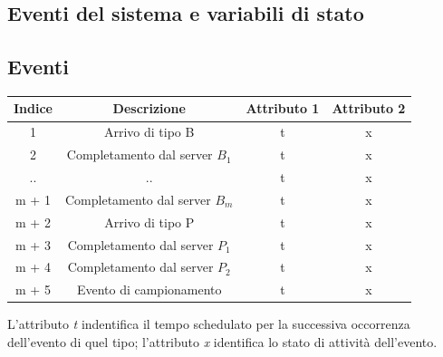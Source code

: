 \documentclass[a4paper, 12pt]{article}
\begin{document}
\subsection{Eventi del sistema e variabili di stato}
\subsection{Eventi}
\begin{center}
  \begin{tabular}{ |c|c|c|c| }
    \hline
    \cellcolor{cellcolor}Indice & \cellcolor{cellcolor}Descrizione & \cellcolor{cellcolor}Attributo 1 & \cellcolor{cellcolor}Attributo 2 \\
    \hline
    \hline
    1 & Arrivo di tipo B & t & x \\
    \hline
    2 & Completamento dal server $B_1$ & t & x \\
    \hline
    .. & .. & t & x \\
    \hline
    m + 1 & Completamento dal server $B_m$ & t & x \\
    \hline
    m + 2 & Arrivo di tipo P & t & x \\
    \hline
    m + 3 & Completamento dal server $P_1$ & t & x \\
    \hline
    m + 4 & Completamento dal server $P_2$ & t & x \\
    \hline
    m + 5 & Evento di campionamento & t & x \\
    \hline
  \end{tabular}
\end{center}
L'attributo \emph{t} indentifica il tempo schedulato per la successiva occorrenza
dell'evento di quel tipo; l'attributo \emph{x} identifica lo stato di attività
dell'evento.
\end{document}
